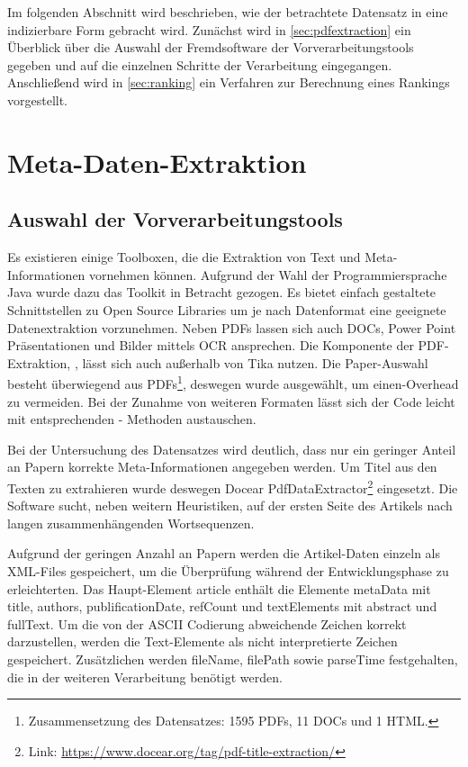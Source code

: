 


Im folgenden Abschnitt wird beschrieben, wie der betrachtete Datensatz in eine indizierbare Form
gebracht wird. Zunächst wird in \autoref{sec:pdfextraction} ein
Überblick über die Auswahl der Fremdsoftware der Vorverarbeitungstools
gegeben und auf die einzelnen Schritte der Verarbeitung eingegangen. Anschließend wird
in \autoref{sec:ranking} ein Verfahren zur Berechnung eines Rankings vorgestellt.



\section{Meta-Daten-Extraktion}\label{sec:pdfextraction}


\subsection{Auswahl der Vorverarbeitungstools}\label{sec:preprosselection}

Es existieren einige Toolboxen, die die Extraktion von Text und
Meta-Informationen vornehmen können.  Aufgrund der Wahl der
Programmiersprache Java wurde dazu das \tika Toolkit in Betracht
gezogen. Es bietet einfach gestaltete Schnittstellen zu Open Source
Libraries um je nach Datenformat eine geeignete Datenextraktion
vorzunehmen. Neben PDFs lassen sich auch DOCs, Power Point
Präsentationen und Bilder mittels OCR ansprechen. Die Komponente der
PDF-Extraktion, \pdfbox, lässt sich auch außerhalb von Tika nutzen.
Die Paper-Auswahl besteht überwiegend aus PDFs\footnote{Zusammensetzung des Datensatzes: 1595 PDFs, 11
DOCs und 1 HTML.}, deswegen wurde \pdfbox ausgewählt, um einen-Overhead
zu vermeiden. Bei der Zunahme von weiteren Formaten lässt sich der
Code leicht mit entsprechenden \tika - Methoden austauschen.

Bei der Untersuchung des Datensatzes wird deutlich, dass nur ein
geringer Anteil an Papern korrekte Meta-Informationen angegeben werden. Um
Titel aus den Texten zu extrahieren wurde deswegen Docear
PdfDataExtractor\footnote{Link:
  \url{https://www.docear.org/tag/pdf-title-extraction/}}
eingesetzt. Die Software sucht, neben weitern Heuristiken, auf der
ersten Seite des Artikels nach langen zusammenhängenden Wortsequenzen.


Aufgrund der geringen Anzahl an Papern werden die Artikel-Daten
einzeln als XML-Files gespeichert, um die Überprüfung während der
Entwicklungsphase zu erleichterten. Das Haupt-Element article enthält
die Elemente metaData mit title, authors, publificationDate, refCount
und textElements mit abstract und fullText.  Um die von der ASCII
Codierung abweichende Zeichen korrekt darzustellen, werden die
Text-Elemente als nicht interpretierte Zeichen gespeichert.
Zusätzlichen werden fileName, filePath sowie parseTime festgehalten,
die in der weiteren Verarbeitung benötigt werden.

